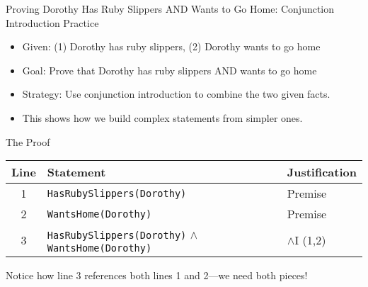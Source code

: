 \documentclass{beamer}
\begin{document}
	\begin{frame}{Proving Dorothy Has Ruby Slippers AND Wants to Go Home: Conjunction Introduction Practice}
		\begin{itemize}
			\item Given: (1) Dorothy has ruby slippers, (2) Dorothy wants to go home
			\item Goal: Prove that Dorothy has ruby slippers AND wants to go home
			\item Strategy: Use conjunction introduction to combine the two given facts.
			\item This shows how we build complex statements from simpler ones.
		\end{itemize}
		
		\begin{block}{The Proof}
			\scriptsize{
			\begin{tabular}{|c|l|l|}
				\hline
				\textbf{Line} & \textbf{Statement} & \textbf{Justification} \\
				\hline
				1 & \texttt{HasRubySlippers(Dorothy)} & Premise \\
				2 & \texttt{WantsHome(Dorothy)} & Premise \\
				3 & \texttt{HasRubySlippers(Dorothy)} $\land$ \texttt{WantsHome(Dorothy)} & $\land$I (1,2) \\
				\hline
			\end{tabular}
			
			Notice how line 3 references both lines 1 and 2—we need both pieces!
		}
		\end{block}
	\end{frame}
	
\end{document}
